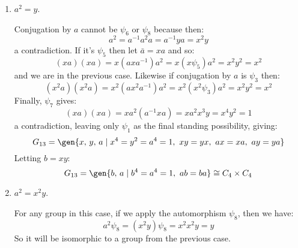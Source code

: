 \begin{enumerate}
\begin{enumerate}[\bfseries A:]
                Firstly, let's show what conjugation by \(a\) cannot be.
                If it's \(\phi_1\):
                \[(xa)(xa) = xa^2(a^{-1}xa) = xa^2 x = 1\]
                If it's \(\phi_6\):
                \[(xya)(xya) = xya^2(a^{-1}xya) = xya^2(x^{-1}x^2y) = x^4 y^2 = 1\]
                If it's \(\phi_8\):
                \[(x^2 ya)(x^2 ya) = x^2 ya^2 (a^{-1}x^2 ya) = x^2 ya^2(x^2 x^2 y) = x^8 y^2 = 1\]
                All of which are contradictions to our assumption.
                So the remaining possibilities are:
                \begin{align*}
                    G_{11} &= \gen{x,\,y,\,a \mid x^4 = y^2 = a^4 = 1,\ xy = yx,\ a^{-1}xa = x^{-1},\ a^{-1}ya = y} \\
                        &= \gen{x,\,a} \times \gen{y} \\
                        &\cong Q_8 \times C_2 \\
                    G_{12a} &= \gen{x,\,y,\,a \mid x^4 = y^2 = a^4 = 1,\ xy = yx,\ a^{-1}xa = xy,\ a^{-1}ya = y} \\
                    G_{12b} &= \gen{x,\,y,\,a \mid x^4 = y^2 = a^4 = 1,\ xy = yx,\ a^{-1}xa = x^{-1}y,\ a^{-1}ya = y}
                \end{align*}

                [Need to show \(G_{12a} \cong G_{12b} \cong C_4 \rtimes C_4\)]

            \item \(a^2 = y\).

                Conjugation by \(a\) cannot be \(\psi_6\) or \(\psi_8\) because then:
                \[a^2 = a^{-1}a^2 a = a^{-1}ya = x^2 y\]
                a contradiction.
                If it's \(\psi_5\) then let \(\bar{a} = xa\) and so:
                \[(xa)(xa) = x(axa^{-1})a^2 = x(x\psi_5)a^2 = x^2 y^2 = x^2\]
                and we are in the previous case.
                Likewise if conjugation by \(a\) is \(\psi_3\) then:
                \[(x^2 a)(x^2 a) = x^2(ax^2 a^{-1})a^2 = x^2(x^2\psi_3)a^2 = x^2 y^2 = x^2\]
                Finally, \(\psi_7\) gives:
                \[(xa)(xa) = xa^2(a^{-1}xa) = xa^2 x^3 y = x^4 y^2 = 1\]
                a contradiction, leaving only \(\psi_1\) as the final standing possibility, giving:
                \[G_{13} = \gen{x,\,y,\,a \mid x^4 = y^2 = a^4 = 1,\ xy = yx,\ ax = xa,\ ay = ya}\]
                Letting \(b = xy\):
                \[G_{13} = \gen{b,\,a \mid b^4 = a^4 = 1,\ ab = ba} \cong C_4 \times C_4\]

            \item \(a^2 = x^2 y\).

                For any group in this case, if we apply the automorphism \(\psi_8\), then we have:
                \[a^2\psi_8 = (x^2 y)\psi_8 = x^2 x^2 y = y\]
                So it will be isomorphic to a group from the previous case.

        \end{enumerate}

\end{enumerate}

